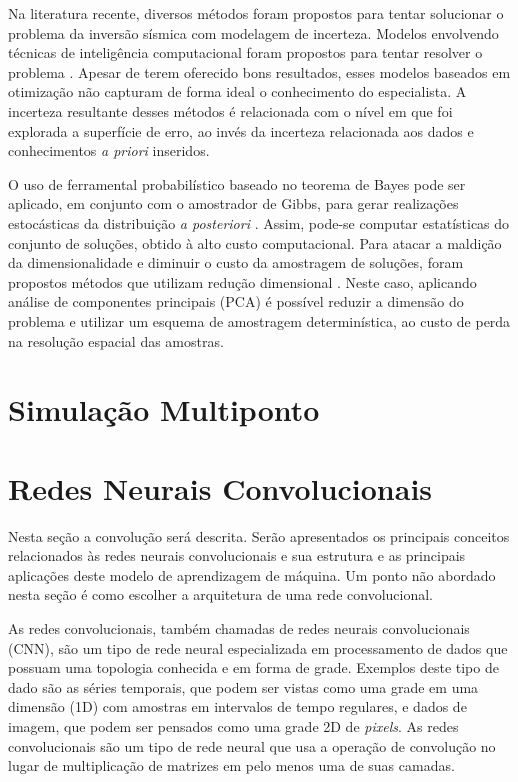 
 Na literatura recente, diversos métodos foram propostos para tentar solucionar
 o problema da inversão sísmica com modelagem de incerteza.
Modelos envolvendo técnicas de inteligência computacional foram propostos para
tentar resolver o problema
\citep{senSimulatedAnnealin,MallickGeneticInve,max_inv_simulated,Artun2011143,MartinezPSO,Sambridge22102013}.
Apesar de terem oferecido bons resultados, esses modelos baseados em otimização
não capturam de forma ideal o conhecimento do especialista. A incerteza
resultante desses métodos é relacionada com o nível em que foi explorada a
superfície de erro, ao invés da incerteza relacionada aos dados e conhecimentos
\textit{a priori} inseridos.

O uso de ferramental probabilístico baseado no teorema de Bayes pode ser
aplicado, em conjunto com o amostrador de Gibbs, para gerar realizações
estocásticas da distribuição \textit{a posteriori} \citep{leandro_SEG}. Assim,
pode-se computar estatísticas do conjunto de soluções, obtido à alto custo
computacional. Para atacar a maldição da dimensionalidade e diminuir o custo da
amostragem de soluções, foram propostos métodos que utilizam redução dimensional
\citep{TompkinsScalabUnce2011}. Neste caso, aplicando análise de componentes
principais (PCA) é possível reduzir a dimensão do problema e utilizar um esquema
de amostragem determinística, ao custo de perda na resolução espacial das
amostras.

\section{Simulação Multiponto}



\section{Redes Neurais Convolucionais}
Nesta seção a convolução será descrita. Serão apresentados os principais conceitos relacionados às redes
neurais convolucionais e sua estrutura e as principais
aplicações deste modelo de aprendizagem de máquina. Um ponto não abordado nesta seção é
como escolher a arquitetura de uma rede convolucional.

As redes convolucionais, também chamadas de redes neurais convolucionais (CNN),
são um tipo de rede neural especializada em processamento de dados que possuam uma
topologia conhecida e em forma de grade. Exemplos deste tipo de dado são as séries
temporais, que podem ser vistas como uma grade em uma dimensão (1D) com amostras
em intervalos de tempo regulares, e dados de imagem, que podem ser pensados como
uma grade 2D de \textit{pixels}. As redes convolucionais são um tipo de rede neural
que usa a operação de convolução no lugar de multiplicação de matrizes em pelo menos uma
de suas camadas.


